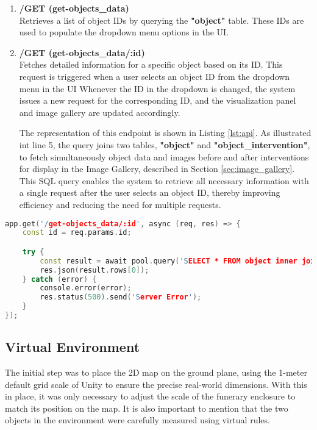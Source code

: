 \begin{enumerate}
  \item \textbf{/GET (get-objects\_data)}
  \\Retrieves a list of object IDs by querying the \textbf{"object"} table. These IDs are used to populate the dropdown menu options in the \gls{UI}.

  \item \textbf{/GET (get-objects\_data/:id)}
  \\Fetches detailed information for a specific object based on its ID. This request is triggered when a user selects an object ID from the dropdown menu in the \gls{UI}
  Whenever the ID in the dropdown is changed, the system issues a new request for the corresponding ID, and the visualization panel and image gallery are updated accordingly.

  The representation of this endpoint is shown in Listing \ref{lst:api}. As illustrated int line 5, the query joins two tables, \textbf{"object"} and \textbf{"object\_intervention"}, to fetch simultaneously object data and images before and after interventions for display in the Image Gallery, described in Section \ref{sec:image_gallery}. 
  This SQL query enables the system to retrieve all necessary information with a single request after the user selects an object ID, thereby improving efficiency and reducing the need for multiple requests.

\end{enumerate}

\begin{lstlisting}[language=C++, caption={Example of defining an API endpoint in Node.js.},label={lst:api}]
  app.get('/get-objects_data/:id', async (req, res) => {
    const id = req.params.id;

    try {
        const result = await pool.query('SELECT * FROM object inner join object_intervention on object.id = object_intervention.object_id WHERE object.id = $1', [id]);
        res.json(result.rows[0]);
    } catch (error) {
        console.error(error);
        res.status(500).send('Server Error');
    }
});
\end{lstlisting}


\subsection{Virtual Environment}
The initial step was to place the \gls{2D} map on the ground plane, using the 1-meter default grid scale of Unity to ensure the precise real-world dimensions. With this in place, it was only necessary to adjust the scale of the funerary enclosure to match its position on the map. It is also important to mention that the two objects in the environment were carefully measured using virtual rules.

